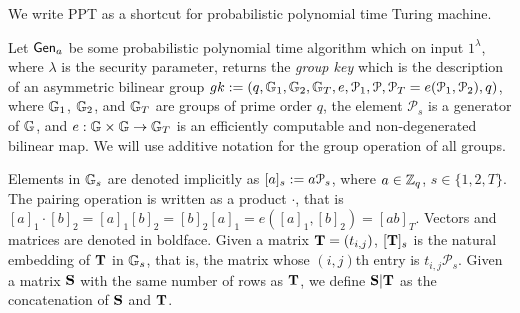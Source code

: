 
We write PPT as a shortcut for probabilistic polynomial time Turing machine.

Let $\mathsf{Gen}_a$ be some probabilistic polynomial time algorithm which on input $1^{\lambda}$, where $\lambda$ is the security parameter, returns the \emph{group key} which is the description of an asymmetric bilinear group $gk:=(q,\mathbb{G}_1,\mathbb{G}_2,\mathbb{G}_T,e,\mathcal{P}_1,\mathcal{P},\mathcal{P}_T=e(\mathcal{P}_1,\mathcal{P}_2),q)$, where $\mathbb{G}_1$, $\mathbb{G}_2$,
and $\mathbb{G}_T$ are groups of prime order $q$, the element $\mathcal{P}_s$ is a generator of 
$\mathbb{G}$, and $e:\mathbb{G}\times\mathbb{G}\to\mathbb{G}_T$ is an efficiently computable and non-degenerated bilinear map. We will use additive notation for the group operation of all groups.

Elements in $\mathbb{G}_s$ are denoted implicitly as $[a]_s:=a \mathcal{P}_s$, where $a\in\mathbb{Z}_q$, $s\in\{1,2,T\}$. 
The pairing operation is written as a product $\cdot$, that is $[a]_1 \cdot [b]_2 = [a]_1 [b]_2= [b]_2[a]_1=e([a]_1,[b]_2)=[ab]_T$. Vectors and matrices are denoted in boldface. Given a matrix $\mathbf{{T}}=(t_{i,j})$, $[\mathbf{{T}}]_s$ is
the natural embedding of $\mathbf{{T}}$ in $\mathbb{G}_s$, that is, the matrix whose $(i,j)$th entry is $t_{i,j}\mathcal{P}_s$. Given a matrix $\mathbf{{S}}$ with the same number of rows as $\mathbf{{T}}$, we define $\mathbf{{S}}|\mathbf{{T}}$ as the concatenation of $\mathbf{{S}}$ and $\mathbf{{T}}$.
